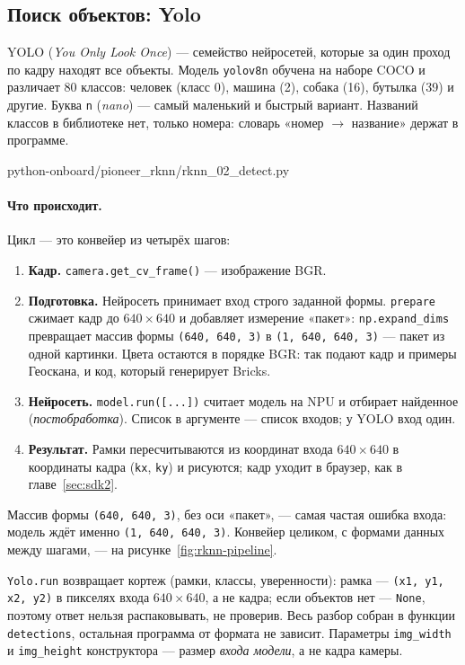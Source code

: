 \subsection{Поиск объектов: Yolo}

YOLO (\emph{You Only Look Once}) --- семейство нейросетей, которые за один проход по кадру находят все объекты. Модель \texttt{yolov8n} обучена на наборе COCO и различает 80 классов: человек (класс 0), машина (2), собака (16), бутылка (39) и другие. Буква \texttt{n} (\emph{nano}) --- самый маленький и быстрый вариант. Названий классов в библиотеке нет, только номера: словарь «номер $\to$ название» держат в программе.

\begin{codefile}[python]{python-onboard/pioneer_rknn/rknn_02_detect.py}
\end{codefile}

\paragraph{Что происходит.} Цикл --- это конвейер из четырёх шагов:
\begin{enumerate}
    \item \textbf{Кадр.} \verb|camera.get_cv_frame()| --- изображение BGR.
    \item \textbf{Подготовка.} Нейросеть принимает вход строго заданной формы. \verb|prepare| сжимает кадр до $640\times640$ и добавляет измерение «пакет»: \verb|np.expand_dims| превращает массив формы \verb|(640, 640, 3)| в \verb|(1, 640, 640, 3)| --- пакет из одной картинки. Цвета остаются в порядке BGR: так подают кадр и примеры Геоскана, и код, который генерирует Bricks.
    \item \textbf{Нейросеть.} \verb|model.run([...])| считает модель на NPU и отбирает найденное (\emph{постобработка}). Список в аргументе --- список входов; у YOLO вход один.
    \item \textbf{Результат.} Рамки пересчитываются из координат входа $640\times640$ в координаты кадра (\verb|kx|, \verb|ky|) и рисуются; кадр уходит в браузер, как в главе~\ref{sec:sdk2}.
\end{enumerate}
Массив формы \verb|(640, 640, 3)|, без оси «пакет», --- самая частая ошибка входа: модель ждёт именно \verb|(1, 640, 640, 3)|. Конвейер целиком, с формами данных между шагами, --- на рисунке~\ref{fig:rknn-pipeline}.



\begin{hintbox}
\verb|Yolo.run| возвращает кортеж (рамки, классы, уверенности): рамка --- \verb|(x1, y1, x2, y2)| в пикселях входа $640\times640$, а не кадра; если объектов нет --- \verb|None|, поэтому ответ нельзя распаковывать, не проверив. Весь разбор собран в функции \verb|detections|, остальная программа от формата не зависит. Параметры \verb|img_width| и \verb|img_height| конструктора --- размер \emph{входа модели}, а не кадра камеры.
\end{hintbox}

